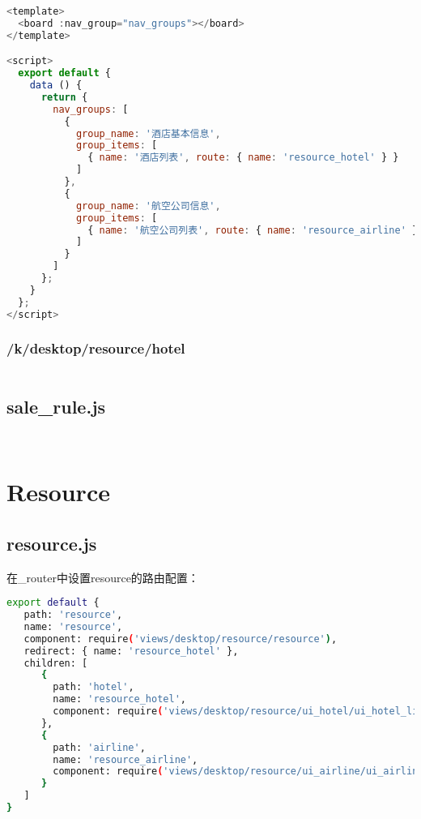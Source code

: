 \begin{lstlisting}[language=JavaScript]
<template>
  <board :nav_group="nav_groups"></board>
</template>

<script>
  export default {
    data () {
      return {
        nav_groups: [
          {
            group_name: '酒店基本信息',
            group_items: [
              { name: '酒店列表', route: { name: 'resource_hotel' } }
            ]
          },
          {
            group_name: '航空公司信息',
            group_items: [
              { name: '航空公司列表', route: { name: 'resource_airline' } }
            ]
          }
        ]
      };
    }
  };
</script>
\end{lstlisting}



\subsection{/k/desktop/resource/hotel}


\begin{lstlisting}[language=bash]

\end{lstlisting}


\section{sale\_rule.js}




\begin{lstlisting}[language=bash]

\end{lstlisting}



\begin{lstlisting}[language=bash]

\end{lstlisting}



\chapter{Resource}

\section{resource.js}

在\_router中设置resource的路由配置：


\begin{lstlisting}[language=bash]
export default {
   path: 'resource',
   name: 'resource',
   component: require('views/desktop/resource/resource'),
   redirect: { name: 'resource_hotel' },
   children: [
      {
        path: 'hotel',
        name: 'resource_hotel',
        component: require('views/desktop/resource/ui_hotel/ui_hotel_list')
      },
      {
        path: 'airline',
        name: 'resource_airline',
        component: require('views/desktop/resource/ui_airline/ui_airline_list')
      }
   ]
}
\end{lstlisting}



